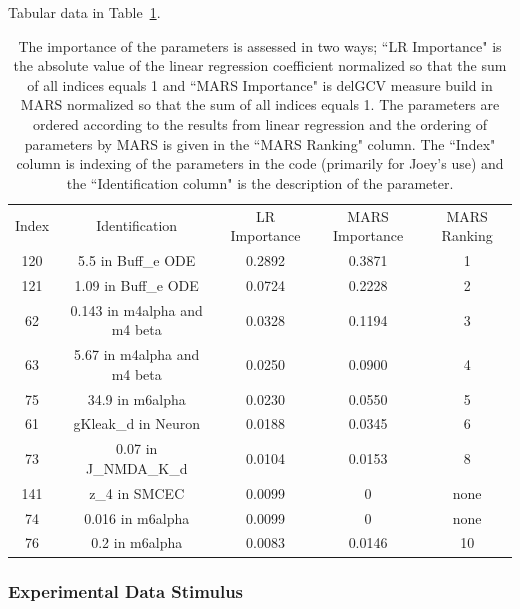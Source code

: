 \documentclass[12pt]{article}
\numberwithin{equation}{section}
\begin{document}
Tabular data in Table~\ref{qoi_K_AC_Mean_rec}.

\begin{table}[h]
\centering
\begin{tabular}{ccccc}
Index & Identification & LR Importance & MARS Importance & MARS Ranking \\
120 & 5.5 in Buff\_e ODE & 0.2892 &  0.3871 & 1\\
121 & 1.09 in Buff\_e ODE & 0.0724 & 0.2228 & 2\\
62 & 0.143 in m4alpha and m4 beta & 0.0328 &  0.1194 & 3\\
63 &   5.67 in m4alpha and m4 beta & 0.0250 & 0.0900 & 4\\
75 & 34.9 in m6alpha & 0.0230 & 0.0550 & 5\\
61 & gKleak\_d in Neuron & 0.0188 & 0.0345 & 6\\
73 & 0.07 in J\_NMDA\_K\_d & 0.0104 & 0.0153 & 8\\
141 & z\_4 in SMCEC & 0.0099 & 0 & none\\
74 & 0.016 in m6alpha & 0.0099 & 0 & none\\
76 & 0.2 in m6alpha & 0.0083 & 0.0146 & 10\\
\end{tabular}
\caption{The importance of the parameters is assessed in two ways; ``LR Importance" is the absolute value of the linear regression coefficient normalized so that the sum of all indices equals 1 and ``MARS Importance" is delGCV measure build in MARS normalized so that the sum of all indices equals 1. The parameters are ordered according to the results from linear regression and the ordering of parameters by MARS is given in the ``MARS Ranking" column. The ``Index" column is indexing of the parameters in the code (primarily for Joey's use) and the ``Identification column" is the description of the parameter.}
\label{qoi_K_AC_Mean_rec}
\end{table}

\newpage

\subsubsection{Experimental Data Stimulus}
\end{document}
